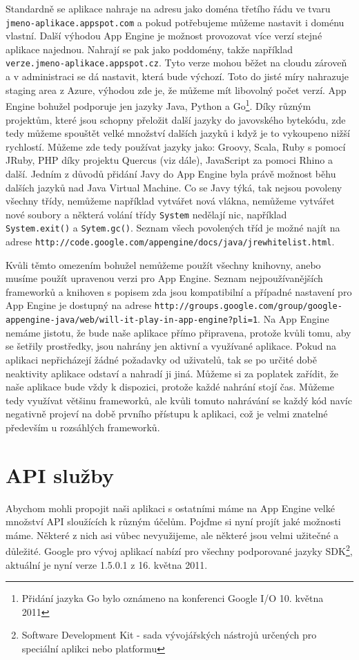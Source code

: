 Standardně se aplikace nahraje na adresu jako doména třetího řádu ve
tvaru \verb|jmeno-aplikace.appspot.com| a pokud potřebujeme můžeme nastavit i doménu vlastní. Další výhodou App Engine je možnost provozovat více verzí stejné aplikace najednou. Nahrají se pak jako poddomény, takže například \verb|verze.jmeno-aplikace.appspot.cz|. Tyto verze mohou běžet na cloudu zároveň a v administraci se dá nastavit, která bude výchozí. Toto do jisté míry nahrazuje staging area z Azure, výhodou zde je, že můžeme mít libovolný počet verzí. App Engine bohužel podporuje jen jazyky Java, Python a Go\footnote{Přidání jazyka Go bylo oznámeno na konferenci Google I/O 10. května 2011}. Díky různým projektům, které jsou schopny přeložit další jazyky do javovského bytekódu, zde tedy můžeme spouštět velké množství dalších jazyků i když je to vykoupeno nižší rychlostí. Můžeme zde tedy používat jazyky jako: Groovy, Scala, Ruby s pomocí JRuby, PHP díky projektu Quercus (viz dále), JavaScript za pomoci Rhino a další. Jedním z důvodů přidání Javy do App Engine byla právě možnost běhu dalších jazyků nad Java Virtual Machine. Co se Javy týká, tak nejsou povoleny všechny třídy, nemůžeme například vytvářet nová vlákna, nemůžeme vytvářet nové soubory a některá volání třídy \verb|System| nedělají nic, například \verb|System.exit()| a \verb|Sytem.gc()|. Seznam všech povolených tříd je možné najít na adrese \verb|http://code.google.com/appengine/docs/java/jrewhitelist.html|. 

Kvůli těmto omezením bohužel nemůžeme použít všechny knihovny, anebo musíme použít upravenou verzi pro App Engine. Seznam nejpoužívanějších frameworků a knihoven s popisem zda jsou kompatibilní a případné nastavení pro App Engine je dostupný na adrese \verb|http://groups.google.com/group/google-appengine-java/web/will-it-play-in-app-engine?pli=1|. Na App Engine nemáme jistotu, že bude naše aplikace přímo připravena, protože kvůli tomu, aby se šetřily prostředky, jsou nahrány jen aktivní a využívané aplikace. Pokud na aplikaci nepřicházejí žádné požadavky od uživatelů, tak se po určité době neaktivity aplikace odstaví a nahradí ji jiná. Můžeme si za poplatek zařídit, že naše aplikace bude vždy k dispozici, protože každé nahrání stojí čas. Můžeme tedy využívat většinu frameworků, ale kvůli tomuto nahrávání se každý kód navíc negativně projeví na době prvního přístupu k aplikaci, což je velmi znatelné především u rozsáhlých frameworků.

\section{API služby}
Abychom mohli propojit naši aplikaci s ostatními máme na App Engine velké množství API sloužících k různým účelům. Pojďme si nyní projít jaké možnosti máme. Některé z nich asi vůbec nevyužijeme, ale některé jsou velmi užitečné a důležité. Google pro vývoj aplikací nabízí pro všechny podporované jazyky SDK\footnote{Software Development Kit - sada vývojářských nástrojů určených pro speciální aplikci nebo platformu}, aktuální je nyní verze 1.5.0.1 z 16. května 2011.


